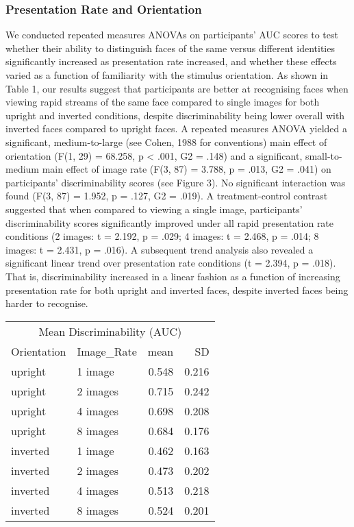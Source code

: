 \documentclass[
  english,
  man]{apa6}
\begin{document}
\hypertarget{presentation-rate-and-orientation}{%
\subsubsection{Presentation Rate and Orientation}\label{presentation-rate-and-orientation}}

We conducted repeated measures ANOVAs on participants' AUC scores to test whether their ability to distinguish faces of the same versus different identities significantly increased as presentation rate increased, and whether these effects varied as a function of familiarity with the stimulus orientation. As shown in Table 1, our results suggest that participants are better at recognising faces when viewing rapid streams of the same face compared to single images for both upright and inverted conditions, despite discriminability being lower overall with inverted faces compared to upright faces. A repeated measures ANOVA yielded a significant, medium-to-large (see Cohen, 1988 for conventions) main effect of orientation (F(1, 29) = 68.258, p \textless{} .001, G2 = .148) and a significant, small-to-medium main effect of image rate (F(3, 87) = 3.788, p = .013, G2 = .041) on participants' discriminability scores (see Figure 3). No significant interaction was found (F(3, 87) = 1.952, p = .127, G2 = .019). A treatment-control contrast suggested that when compared to viewing a single image, participants' discriminability scores significantly improved under all rapid presentation rate conditions (2 images: t = 2.192, p = .029; 4 images: t = 2.468, p = .014; 8 images: t = 2.431, p = .016). A subsequent trend analysis also revealed a significant linear trend over presentation rate conditions (t = 2.394, p = .018). That is, discriminability increased in a linear fashion as a function of increasing presentation rate for both upright and inverted faces, despite inverted faces being harder to recognise.

\begin{tabular}{l|l|r|r}
\hline
\multicolumn{4}{c|}{Mean Discriminability (AUC)} \\
\cline{1-4}
Orientation & Image\_Rate & mean & SD\\
\hline
upright & 1 image & 0.548 & 0.216\\
\hline
upright & 2 images & 0.715 & 0.242\\
\hline
upright & 4 images & 0.698 & 0.208\\
\hline
upright & 8 images & 0.684 & 0.176\\
\hline
inverted & 1 image & 0.462 & 0.163\\
\hline
inverted & 2 images & 0.473 & 0.202\\
\hline
inverted & 4 images & 0.513 & 0.218\\
\hline
inverted & 8 images & 0.524 & 0.201\\
\hline
\end{tabular}
\end{document}
